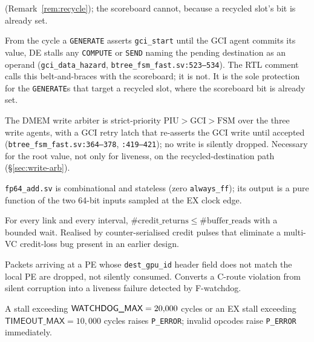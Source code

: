 \documentclass[journal,10pt]{IEEEtran}
\theoremstyle{plain}
\theoremstyle{definition}
\theoremstyle{remark}
\newcommand{\sv}[1]{\texttt{#1}}
\begin{document}
\begin{description}[leftmargin=2.2em,style=nextline]
  (Remark~\ref{rem:recycle}); the scoreboard cannot, because a recycled
  slot's bit is already set.
\item[\textsf{F-gci-haz} (In-flight \texttt{GENERATE} interlock).] From
  the cycle a \texttt{GENERATE} asserts \sv{gci\_start} until the GCI
  agent commits its value, \textsf{DE} stalls any \texttt{COMPUTE} or
  \texttt{SEND} naming the pending destination as an operand
  (\sv{gci\_data\_hazard}, \sv{btree\_fsm\_fast.sv:523--534}). The RTL
  comment calls this belt-and-braces with the scoreboard; it is not. It
  is the sole protection for the \GenRecycled{} \texttt{GENERATE}s that
  target a recycled slot, where the scoreboard bit is already set.
\item[\textsf{F-arb} (Write arbitration).] The DMEM write arbiter is
  strict-priority $\mathrm{PIU} > \mathrm{GCI} > \mathrm{FSM}$ over the
  three write agents, with a GCI retry latch that re-asserts the GCI
  write until accepted (\sv{btree\_fsm\_fast.sv:364--378}, \sv{:419--421});
  no write is silently dropped. Necessary for the root value, not only
  for liveness, on the recycled-destination path
  (\S\ref{sec:write-arb}).
\item[\textsf{F-fadd} (FADD purity).] \sv{fp64\_add.sv} is combinational
  and stateless (zero \sv{always\_ff}); its output is a pure function of
  the two 64-bit inputs sampled at the EX clock edge.
\item[$\dagger$\,\textsf{F-credit} (Credit conservation).] For every link and every
  interval, $\#\mathrm{credit\_returns} \leq \#\mathrm{buffer\_reads}$
  with a bounded wait. Realised by counter-serialised credit pulses that
  eliminate a multi-VC credit-loss bug present in an earlier design.
\item[$\dagger$\,\textsf{F-misroute} (Misroute drop).] Packets arriving at a PE
  whose \sv{dest\_gpu\_id} header field does not match the local PE are
  dropped, not silently consumed. Converts a \textsf{C-route}
  violation from silent corruption into a liveness failure detected by
  \textsf{F-watchdog}.
\item[$\dagger$\,\textsf{F-watchdog} (Liveness guard).] A stall exceeding
  $\textsf{WATCHDOG\_MAX} = 20{,}000$ cycles or an EX stall exceeding
  $\textsf{TIMEOUT\_MAX} = 10{,}000$ cycles raises \texttt{P\_ERROR};
  invalid opcodes raise \texttt{P\_ERROR} immediately.
\end{description}
\end{document}
